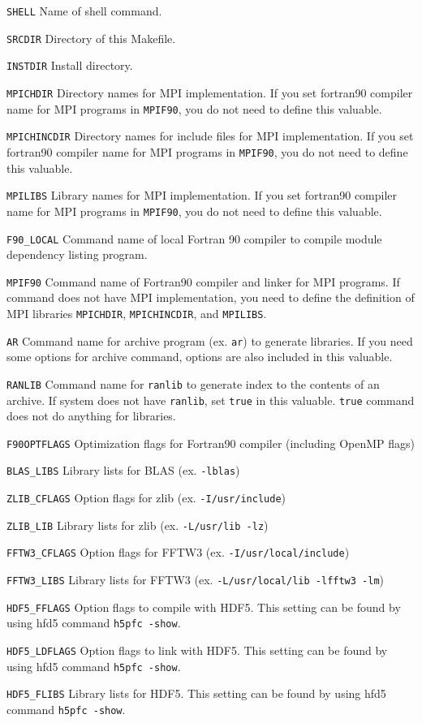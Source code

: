 \begin{description}
\item{\verb|SHELL|}    Name of shell command.
\item{\verb|SRCDIR|}   Directory of this Makefile. 
\item{\verb|INSTDIR|}  Install directory.
\item{\verb|MPICHDIR|} Directory names for MPI implementation. If you set fortran90 compiler name for MPI programs in \verb|MPIF90|, you do not need to define this valuable.
\item{\verb|MPICHINCDIR|} Directory names for include files for MPI implementation. If you set fortran90 compiler name for MPI programs in \verb|MPIF90|, you do not need to define this valuable.
\item{\verb|MPILIBS|}   Library names for MPI implementation. If you set fortran90 compiler name for MPI programs in \verb|MPIF90|, you do not need to define this valuable.
\item{\verb|F90_LOCAL|} Command name of local Fortran 90 compiler to compile module dependency listing program.
\item{\verb|MPIF90|} Command name of Fortran90 compiler and linker for MPI programs. If command does not have MPI implementation, you need to define the definition of MPI libraries \verb|MPICHDIR|, \verb|MPICHINCDIR|, and \verb|MPILIBS|.
\item{\verb|AR|}     Command name for archive program (ex. \verb|ar|) to generate libraries. If you need some options for archive command, options are also included in this valuable.
\item{\verb|RANLIB|} Command name for \verb|ranlib| to generate index to the contents of an archive. If system does not have \verb|ranlib|, set \verb|true| in this valuable. \verb|true| command does not do anything for libraries.
\item{}
\item{\verb|F90OPTFLAGS|}  Optimization flags for Fortran90 compiler (including OpenMP flags)
\item{\verb|BLAS_LIBS|} Library lists for BLAS  (ex.  \verb|-lblas|)
\item{\verb|ZLIB_CFLAGS|} Option flags for zlib  (ex.  \verb|-I/usr/include|)
\item{\verb|ZLIB_LIB|}   Library lists for zlib (ex. \verb|-L/usr/lib -lz|)
\item{\verb|FFTW3_CFLAGS|} Option flags for FFTW3  (ex.  \verb|-I/usr/local/include|)
\item{\verb|FFTW3_LIBS|}   Library lists for FFTW3 (ex. \verb|-L/usr/local/lib -lfftw3 -lm|)
\item{\verb|HDF5_FFLAGS|}  Option flags to compile with HDF5. This setting can be found by using hfd5 command \verb|h5pfc -show|.

\item{\verb|HDF5_LDFLAGS|}    Option flags  to link with  HDF5. This setting can be found by using hfd5 command \verb|h5pfc -show|.

\item{\verb|HDF5_FLIBS|}   Library lists for HDF5. This setting can be found by using hfd5 command \verb|h5pfc -show|.

\end{description}
